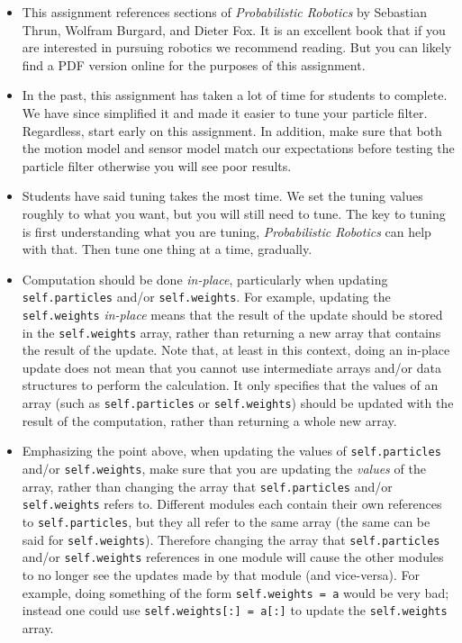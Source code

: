 \documentclass[final]{article}
\newcommand{\code}[1]{\texttt{#1}}
\begin{document}
\begin{itemize}
\item This assignment references sections of \textit{Probabilistic Robotics} by Sebastian Thrun, Wolfram Burgard, and Dieter Fox. It is an excellent book that if you are interested in pursuing robotics we recommend reading. But you can likely find a PDF version online for the purposes of this assignment.
\item In the past, this assignment has taken a lot of time for students to complete. We have since simplified it and made it easier to tune your particle filter. Regardless, start early on this assignment. In addition, make sure that both the motion model and sensor model match our expectations before testing the particle filter otherwise you will see poor results. 
\item Students have said tuning takes the most time. We set the tuning values roughly to what you want, but you will still need to tune. The key to tuning is first understanding what you are tuning, \textit{Probabilistic Robotics} can help with that. Then tune one thing at a time, gradually.
\item Computation should be done \textit{in-place}, particularly when updating \code{self.particles} and/or \code{self.weights}. For example, updating the \code{self.weights} \textit{in-place} means that the result of the update should be stored in the \code{self.weights} array, rather than returning a new array that contains the result of the update. Note that, at least in this context, doing an in-place update does not mean that you cannot use intermediate arrays and/or data structures to perform the calculation. It only specifies that the values of an array (such as \code{self.particles} or \code{self.weights}) should be updated with the result of the computation, rather than returning a whole new array.

\item Emphasizing the point above, when updating the values of \code{self.particles} and/or \code{self.weights}, make sure that you are updating the \textit{values} of the array, rather than changing the array that \code{self.particles} and/or \code{self.weights} refers to. Different modules each contain their own references to \code{self.particles}, but they all refer to the same array (the same can be said for \code{self.weights}). Therefore changing the array that \code{self.particles} and/or \code{self.weights} references in one module will cause the other modules to no longer see the updates made by that module (and vice-versa). For example, doing something of the form \code{self.weights = a} would be very bad; instead one could use \code{self.weights[:] = a[:]} to update the \code{self.weights} array.


\end{itemize}
\end{document}
